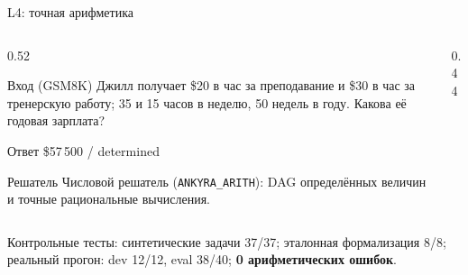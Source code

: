 \documentclass[aspectratio=169,11pt]{beamer}
\newcommand{\Prov}[1]{\textcolor{provencolor}{#1}}
\begin{document}
\begin{frame}[shrink=5]{L4: точная арифметика}
  \footnotesize
  \begin{columns}[T,onlytextwidth]
    \begin{column}{0.52\textwidth}
      \begin{block}{Вход (GSM8K)}
        Джилл получает \$20 в час за преподавание и \$30 в час за
        тренерскую работу; 35 и 15 часов в неделю, 50 недель в году.
        Какова её годовая зарплата?
      \end{block}
      \begin{block}{Ответ}
        \Prov{\$57\,500 / determined}
      \end{block}
      \begin{block}{Решатель}
        Числовой решатель (\texttt{ANKYRA\_ARITH}): DAG определённых величин
        и точные рациональные вычисления.
      \end{block}
    \end{column}
    \begin{column}{0.44\textwidth}
      \centering
    \end{column}
  \end{columns}

  \vspace{1mm}
  {\scriptsize Контрольные тесты: синтетические задачи 37/37;
  эталонная формализация 8/8; реальный прогон: dev 12/12, eval 38/40;
  \textbf{0 арифметических ошибок}.}
\end{frame}
\end{document}

